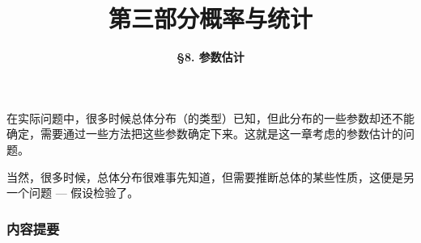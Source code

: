

\usepackage{tabu}


\title[Probability \& Statistics]{\LARGE \bfseries 第三部分\quad 概率与统计} %
\author[Parameters Estimation] %
{\Large \bfseries \S 8. 参数估计}
\date{}






\begin{frame}

\titlepage %

\end{frame}


\begin{frame}

{
\large
在实际问题中，很多时候总体分布（的类型）已知，但此分布的一些参数却还不能确定，需要通过一些方法把这些参数确定下来。这就是这一章考虑的参数估计的问题。

\vspace{1em}
\pause

当然，很多时候，总体分布很难事先知道，但需要推断总体的某些性质，这便是另一个问题 --- 假设检验了。
}

\end{frame}


\begin{frame}
\frametitle{内容提要} %
\tableofcontents %
\end{frame}

